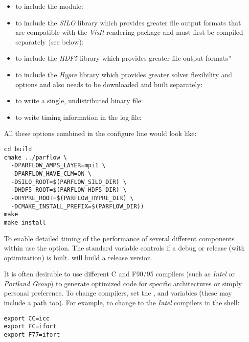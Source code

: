 \begin{enumerate}
\begin{itemize}
\item to include the  module:  
\item to include the \emph{SILO} 
library which provides greater file output formats that are compatible
with the \emph{VisIt} rendering package and must first be compiled 
separately (see below): 
\item to include the \emph{HDF5} 
library which provides greater file output formats'' 
\item to include the \emph{Hypre} library which provides greater solver
flexibility and options and also needs to be downloaded and built separately:
\item to write a single, undistributed \parflow{} binary file:
\item to write timing information in the log file: 
\end{itemize}

All these options combined in the configure line would look like:

\begin{display}\begin{verbatim}
cd build
cmake ../parflow \
  -DPARFLOW_AMPS_LAYER=mpi1 \
  -DPARFLOW_HAVE_CLM=ON \
  -DSILO_ROOT=$(PARFLOW_SILO_DIR) \
  -DHDF5_ROOT=$(PARFLOW_HDF5_DIR) \
  -DHYPRE_ROOT=$(PARFLOW_HYPRE_DIR) \
  -DCMAKE_INSTALL_PREFIX=$(PARFLOW_DIR)) 
make 
make install
\end{verbatim}\end{display}

To enable detailed timing of the performance of several different
components within \parflow{} use the  option.
The standard  variable controls if a debug or
release (with optimization) is built.
 will build a release version.

It is often desirable to use different C and F90/95 compilers (such as
\emph{Intel} or \emph{Portland Group}) to generate optimized code for
specific architectures or simply personal preference.  To change
compilers, set the \code{CC},  and  variables
(these may include a path too).  For example, to change to the
\emph{Intel} compilers in the  shell:
\begin{display}\begin{verbatim}
export CC=icc
export FC=ifort
export F77=ifort
\end{verbatim}\end{display}


\end{enumerate}
